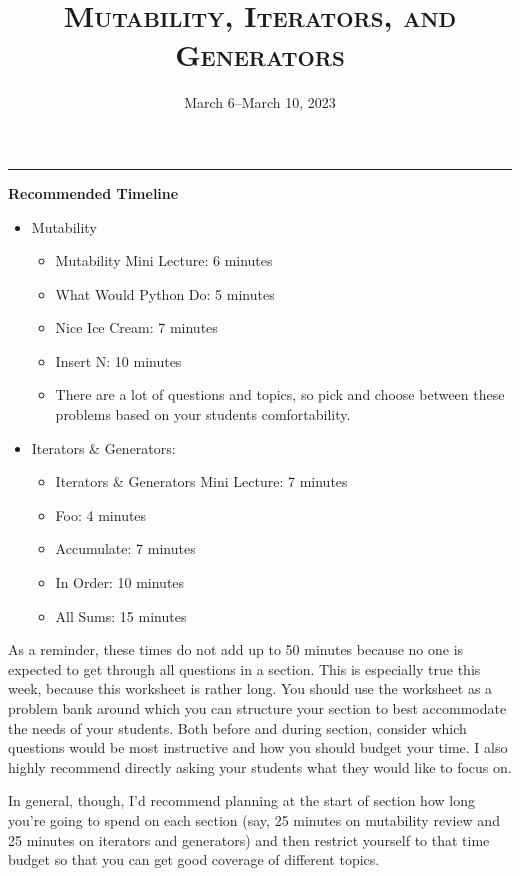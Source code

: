 \documentclass{exam}
\title{\textsc{Mutability, Iterators, and Generators}}
\date{March 6--March 10, 2023}
\begin{document}
\maketitle
\rule{\textwidth}{0.15em}


\begin{guide}
    \textbf{Recommended Timeline}
    \begin{itemize}
        \item Mutability
        \begin{itemize}
            \item Mutability Mini Lecture: 6 minutes
            \item What Would Python Do: 5 minutes
            \item Nice Ice Cream: 7 minutes
            \item Insert N: 10 minutes
            \item There are a lot of questions and topics, so pick and choose between these problems based on your students comfortability.
        \end{itemize}
        \item Iterators \& Generators:
        \begin{itemize}
            \item Iterators \& Generators Mini Lecture: 7 minutes
            \item Foo: 4 minutes
            \item Accumulate: 7 minutes
            \item In Order: 10 minutes
            \item All Sums: 15 minutes
        \end{itemize}
    \end{itemize}

    As a reminder, these times do not add up to 50 minutes because no one is expected 
    to get through all questions in a section. This is especially true this week, 
    because this worksheet is rather long. You should use the worksheet as a problem bank
     around which you can structure your section to best accommodate the needs of your 
     students. Both before and during section, consider which questions would be most 
     instructive and how you should budget your time. I also highly recommend directly asking your students what they would like to focus on.
     
    In general, though, I'd recommend planning at the start of section how long you're going to 
    spend on each section (say, 25 minutes on mutability review and 25 minutes on iterators and generators)
    and then restrict yourself to that time budget so that you can get good coverage of different topics. 
\end{guide}
\end{document}
